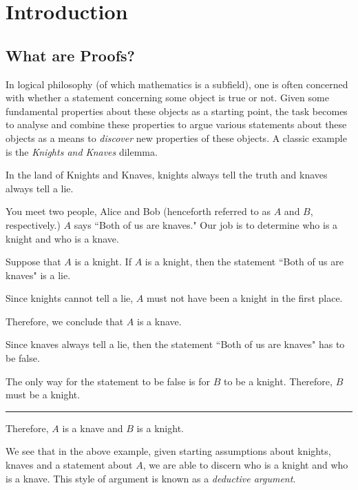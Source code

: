 \documentclass[../proofs.tex]{subfiles}
\newcommand{\hrulesmall}{\rule{0.4\textwidth}{1pt}}
\begin{document}
\chapter{Introduction}
\section{What are Proofs?}
In logical philosophy (of which mathematics is a subfield), one is often concerned
with whether a statement concerning some object is true or not. Given some fundamental
properties about these objects as a starting point, the task becomes to analyse
and combine these properties to argue various statements about these objects as
a means to \emph{discover} new properties of these objects. A classic example is the
\textit{Knights and Knaves} dilemma.

\begin{expl}
In the land of Knights and Knaves, knights always tell the truth and
  knaves always tell a lie.

You meet two people, Alice and Bob (henceforth referred to as $A$ and $B$, respectively.)
$A$ says ``Both of us are knaves." Our job is to determine who is a knight and who is a knave.

\begin{list}{}{}
  \item Suppose that $A$ is a knight. If $A$ is a knight, then the statement ``Both of us are knaves" is a lie.
  \item Since knights cannot tell a lie, $A$ must not have been a knight in the first place.
  \item Therefore, we conclude that $A$ is a knave.
  \item Since knaves always tell a lie, then the statement ``Both of us are knaves" has to be false.
  \item The only way for the statement to be false is for $B$ to be a knight. Therefore, $B$ must be a knight.
  \item \hrulesmall
  \item Therefore, $A$ is a knave and $B$ is a knight.
\end{list}
\end{expl}

We see that in the above example, given starting assumptions about knights, knaves and
a statement about $A$, we are able to discern who is a knight and who is a knave.
This style of argument is known as a \emph{deductive argument}.
\end{document}
